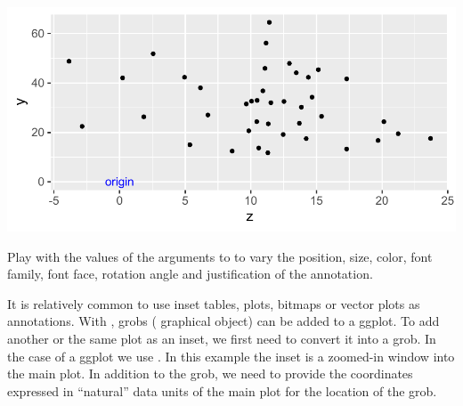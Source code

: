 \documentclass[krantz2]{krantz}\usepackage{knitr}
\begin{document}
\begin{knitrout}\footnotesize
{}\color{fgcolor}\begin{kframe}
\begin{alltt}
  \hlopt{+}
  \hlstd{()} \hlopt{+}
  \hlstd{(} \hlstd{=} \hlstd{,}
            \hlstd{=} \hlstd{,}
            \hlstd{=} \hlstd{,}  \hlstd{=} \hlstd{,}
            \hlstd{=} \hlstd{,}
           \hlstd{=}\hlstd{)}
\end{alltt}
\end{kframe}

{\centering \includegraphics[width=.7\textwidth]{figure/pos-annotate-01-1} 

}


\end{knitrout}

\begin{playground}
Play with the values of the arguments to  to vary the position, size, color, font family, font face, rotation angle and justification of the annotation.
\end{playground}

It is relatively common to use inset tables, plots, bitmaps or vector plots as annotations. With , grobs ( graphical object) can be added to a ggplot. To add another or the same plot as an inset, we first need to convert it into a grob. In the case of a ggplot we use . In this example the inset is a zoomed-in window into the main plot. In addition to the grob, we need to provide the coordinates expressed in ``natural'' data units of the main plot for the location of the grob.
\end{document}
